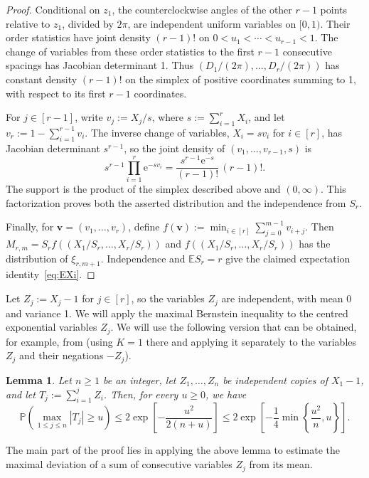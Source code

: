 \documentclass[12pt,a4paper]{article}
\numberwithin{equation}{section}
\newtheorem{lemma}[theorem]{Lemma}
\theoremstyle{definition}
\theoremstyle{remark}
\newcommand{\V}[1]{\boldsymbol{#1}}
\newcommand{\me}{\mathrm{e}}
\begin{document}
\begin{proof}
Conditional on $z_1$, the counterclockwise angles of the other $r-1$ points relative to $z_1$, divided by $2\pi$, are independent uniform variables on $[0,1)$. Their order statistics have joint density $(r-1)!$ on $0<u_1<\cdots<u_{r-1}<1$. The change of variables from these order statistics to the first $r-1$ consecutive spacings has Jacobian determinant 1. Thus $(D_1/(2\pi),\ldots,D_r/(2\pi))$ has constant density $(r-1)!$ on the simplex of positive coordinates summing to 1, with respect to its first $r-1$ coordinates.

For $j\in[r-1]$, write $v_j:=X_j/s$, where $s:=\sum_{i=1}^r X_i$, and let $v_r:=1-\sum_{i=1}^{r-1}v_i$. The inverse change of variables, $X_i=sv_i$ for $i\in[r]$, has Jacobian determinant $s^{r-1}$, so the joint density of $(v_1,\ldots,v_{r-1},s)$ is
\[
 s^{r-1}\prod_{i=1}^r \me^{-sv_i}
 =\frac{s^{r-1}\me^{-s}}{(r-1)!}\,(r-1)!.
\]
The support is the product of the simplex described above and $(0,\infty)$. This factorization proves both the asserted distribution and the independence from $S_r$. 

Finally, for $\V{v}=(v_1,\ldots,v_r)$, define $f(\V{v}):=\min_{i\in[r]}\sum_{j=0}^{m-1}v_{i+j}$. Then $M_{r,m}=S_rf((X_1/S_r,\ldots,X_r/S_r))$ and $f((X_1/S_r,\ldots,X_r/S_r))$ has the distribution of $\xi_{r,m+1}$. Independence and $\mathbb E S_r=r$ give the claimed expectation identity~\eqref{eq:EXi}.
\end{proof}


Let $Z_j:=X_j-1$ for $j\in [r]$, so the variables $Z_j$ are independent, with mean 0 and variance 1. We will apply the maximal Bernstein inequality
to the centred exponential variables $Z_j$. We will use the following version that can be obtained, for example, from \cite[Theorem B.2]{Rio17atwdrp} (using $K=1$ there and applying it separately to the variables $Z_j$ and their negations $-Z_j$).

\begin{lemma}\label{lem:partial-max}
Let $n\ge1$ be an integer, let $Z_1,\ldots,Z_n$ be independent copies of $X_1-1$, and let $T_j:=\sum_{i=1}^jZ_i$.  Then, for every $u\ge0$, we have
\begin{equation*}
 \mathbb{P}\left(\max_{1\le j\le n}|T_j|\ge u\right)
 \le 2\exp\left[ -\frac{u^2}{2(n+u)}\right]
 \le 2\exp\left[-\frac14\min\left\{\frac{u^2}{n},u\right\}\right].
\end{equation*}
\end{lemma}


The main part of the proof lies in applying the above lemma to estimate the maximal deviation of a sum of consecutive variables $Z_j$ from its mean.
\end{document}
